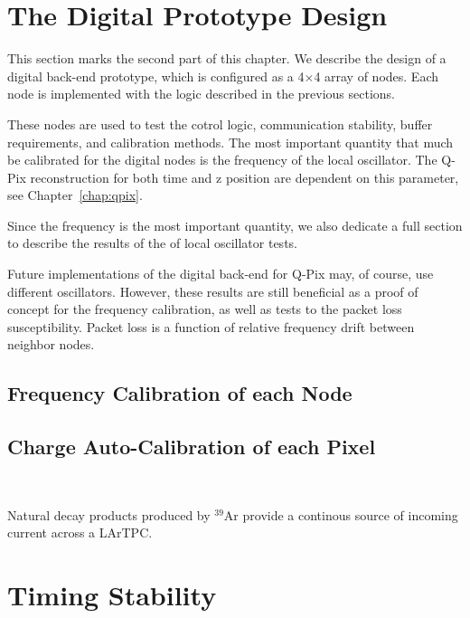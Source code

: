 \section{The Digital Prototype Design}

This section marks the second part of this chapter.
We describe the design of a digital back-end prototype, which is configured as a 4$\times$4 array of nodes.
Each node is implemented with the logic described in the previous sections.

These nodes are used to test the cotrol logic, communication stability, buffer requirements, and calibration methods.
The most important quantity that much be calibrated for the digital nodes is the frequency of the local oscillator.
The Q-Pix reconstruction for both time and z position are dependent on this parameter, see Chapter~\ref{chap:qpix}.

Since the frequency is the most important quantity, we also dedicate a full section to describe the results of the of local oscillator tests.

Future implementations of the digital back-end for Q-Pix may, of course, use different oscillators.
However, these results are still beneficial as a proof of concept for the frequency calibration, as well as tests to the packet loss susceptibility.
Packet loss is a function of relative frequency drift between neighbor nodes.

\subsection{Frequency Calibration of each Node}







\subsection{Charge Auto-Calibration of each Pixel}~\label{sec:charge_calibration}

Natural decay products produced by $^{39}$Ar provide a continous source of incoming current across a LArTPC.


\section{Timing Stability}

